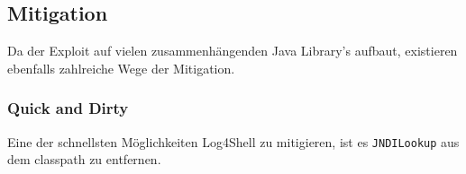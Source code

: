 
\subsection{Mitigation}
Da der \mysubtitle  Exploit auf vielen zusammenhängenden Java Library's aufbaut, existieren ebenfalls zahlreiche Wege der Mitigation.

\subsubsection{Quick and Dirty}
Eine der schnellsten Möglichkeiten Log4Shell zu mitigieren, ist es \verb|JNDILookup| aus dem classpath zu entfernen.
